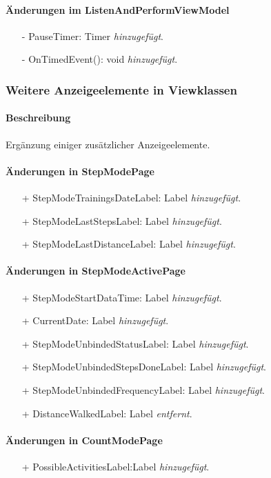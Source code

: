 \documentclass[a4paper,12pt]{article}
\begin{document}
\paragraph{Änderungen im ListenAndPerformViewModel}
\begin{itemize}
	\item[-] PauseTimer: Timer \textit{hinzugefügt}.
	\item[-] OnTimedEvent(): void \textit{hinzugefügt}.
\end{itemize}

\subsubsection{Weitere Anzeigeelemente in Viewklassen}
\paragraph{Beschreibung}
Ergänzung einiger zusätzlicher Anzeigeelemente.
\paragraph{Änderungen in StepModePage}
\begin{itemize}
	\item[+] StepModeTrainingsDateLabel: Label \textit{hinzugefügt}.
	\item[+] StepModeLastStepsLabel: Label \textit{hinzugefügt}.
	\item[+] StepModeLastDistanceLabel: Label \textit{hinzugefügt}.
\end{itemize}
\paragraph{Änderungen in StepModeActivePage}
\begin{itemize}
	\item[+] StepModeStartDataTime: Label \textit{hinzugefügt}.
	\item[+] CurrentDate: Label \textit{hinzugefügt}.
	\item[+] StepModeUnbindedStatusLabel: Label \textit{hinzugefügt}.
	\item[+] StepModeUnbindedStepsDoneLabel: Label \textit{hinzugefügt}.
	\item[+] StepModeUnbindedFrequencyLabel: Label \textit{hinzugefügt}.
	\item[+] DistanceWalkedLabel: Label \textit{entfernt}.
\end{itemize}
\paragraph{Änderungen in CountModePage}
\begin{itemize}
	\item[+] PossibleActivitiesLabel:Label \textit{hinzugefügt}.
\end{itemize}
\end{document}
